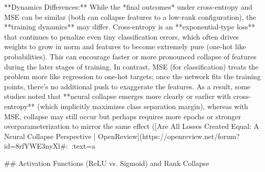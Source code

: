 **Dynamics Differences:** While the *final outcomes* under cross-entropy and MSE can be similar (both can collapse features to a low-rank configuration), the **training dynamics** may differ. Cross-entropy is an **exponential-type loss** that continues to penalize even tiny classification errors, which often drives weights to grow in norm and features to become extremely pure (one-hot like probabilities). This can encourage faster or more pronounced collapse of features during the later stages of training. In contrast, MSE (for classification) treats the problem more like regression to one-hot targets; once the network fits the training points, there’s no additional push to exaggerate the features. As a result, some studies noted that **neural collapse emerges more clearly or earlier with cross-entropy** (which implicitly maximizes class separation margin), whereas with MSE, collapse may still occur but perhaps requires more epochs or stronger overparameterization to mirror the same effect ([Are All Losses Created Equal: A Neural Collapse Perspective | OpenReview](https://openreview.net/forum?id=8rfYWE3nyXl#:~:text=a%

## Activation Functions (ReLU vs. Sigmoid) and Rank Collapse

